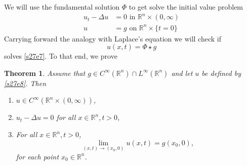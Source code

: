 \documentclass{article}
\theoremstyle{plain}
\newtheorem{thm}{Theorem}
\numberwithin{thm}{section}
\theoremstyle{plain}
\numberwithin{prop}{section}
\theoremstyle{definition}
\numberwithin{defn}{section}
\theoremstyle{remark}
\numberwithin{equation}{section}
\begin{document}
We will use the fundamental solution $\Phi$ to get solve the initial value problem 
\begin{equation}\label{s27e7}
\begin{split}
u_t - \Delta u &= 0 \text{ in } \mathbb{R}^n \times (0, \infty) \\
u &= g \text{ on } \mathbb{R}^n \times \{t = 0\}
\end{split}
\end{equation}
Carrying forward the analogy with Laplace's equation we will check if 
\begin{equation}\label{s27e8}
u(x, t) = \Phi \star g
\end{equation}
solves \eqref{s27e7}. To that end, we prove
\begin{thm}\label{s27t1}
Assume that $g \in C^\infty(\mathbb{R}^n) \cap L^\infty(\mathbb{R}^n)$ and let $u$ be defined by \eqref{s27e8}. 
Then
\begin{enumerate}
\item $u \in C^\infty(\mathbb{R}^n \times (0, \infty))$,
\item $u_t - \Delta u = 0$ for all $x \in \mathbb{R}^n, t > 0$,
\item For all $x \in \mathbb{R}^n, t > 0$,
\[
\lim_{(x, t) \rightarrow (x_0, 0)}u(x, t) = g(x_0, 0),
\]
for each point $x_0 \in \mathbb{R}^n$.
\end{enumerate}
\end{thm}
\end{document}
